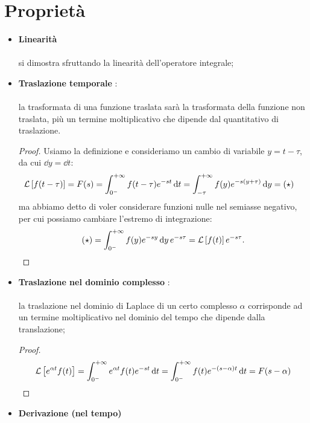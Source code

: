 \section{Proprietà}
\begin{itemize}
	\item \textbf{Linearità} \rarr {} \\ \\ si dimostra sfruttando la linearità dell'operatore integrale;
	\item \textbf{Traslazione temporale} \rarr {} : \\ \\ la trasformata di una funzione traslata sarà la trasformata della funzione non traslata, più un termine moltiplicativo che dipende dal quantitativo di traslazione.
	\begin{proof}
	Usiamo la definizione e consideriamo un cambio di variabile $y = t-\tau$, da cui $\dd{y} = \dd{t}$:
	\begin{align*}
		\mathcal{L}\left[ f(t-\tau) \right] = F(s) & = \int_{0^-}^{+\infty} f(t-\tau) e^{-st} \dd{t} = \int_{-\tau}^{+\infty} f(y)e^{-s(y+\tau)} \dd{y} = (\star)
	\end{align*}
	ma abbiamo detto di voler considerare funzioni nulle nel semiasse negativo, per cui possiamo cambiare l'estremo di integrazione:
	\begin{equation*}
		(\star) = \int_{0^-}^{+\infty} f(y)e^{-sy}\dd{y} e^{-s\tau} = \mathcal{L}\left[ f(t) \right]e^{-s\tau}.
	\end{equation*}
	\end{proof}
	\item \textbf{Traslazione nel dominio complesso} \rarr {} : \\ \\ la traslazione nel dominio di Laplace  di un certo complesso $\alpha$ corrisponde ad un termine moltiplicativo nel dominio del tempo che dipende dalla translazione;
	\begin{proof}
		\begin{equation*}
		\mathcal{L}\left[ e^{\alpha t}f(t) \right]  = \int_{0^-}^{+\infty} e^{\alpha t}f(t) e^{-st} \dd{t} = \int_{0^-}^{+\infty} f(t) e^{-(s-\alpha)t} \dd{t} = F(s-\alpha) 		
		\end{equation*}
	\end{proof}
	\item \textbf{Derivazione (nel tempo)} \rarr {}

\end{itemize}

